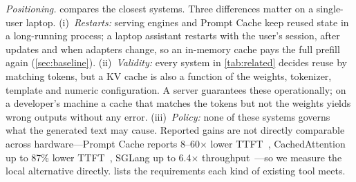 \documentclass[journal]{IEEEtran}
\theoremstyle{definition}
\begin{document}
\emph{Positioning.}  compares the closest systems. Three differences matter on a
single-user laptop. (i)~\emph{Restarts:} serving engines and Prompt Cache keep reused state in a
long-running process; a laptop assistant restarts with the user's session, after updates and when
adapters change, so an in-memory cache pays the full prefill again (\cref{sec:baseline}).
(ii)~\emph{Validity:} every system in \cref{tab:related} decides reuse by matching tokens, but a KV
cache is also a function of the weights, tokenizer, template and numeric configuration. A server
guarantees these operationally; on a developer's machine a cache that matches the tokens but not
the weights yields wrong outputs without any error. (iii)~\emph{Policy:} none of these systems
governs what the generated text may cause. Reported gains are not directly comparable across
hardware---Prompt Cache reports 8--60$\times$ lower TTFT~\cite{gim2024promptcache},
CachedAttention up to 87\% lower TTFT~\cite{gao2024cachedattention}, SGLang up to 6.4$\times$
throughput~\cite{zheng2024sglang}---so we measure the local alternative directly.  lists the requirements each kind of existing tool meets.
\end{document}
